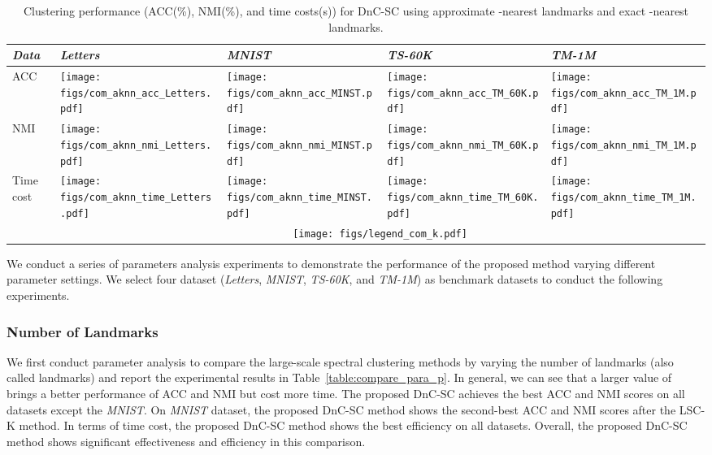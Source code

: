 \begin{table}\centering
  \caption{Clustering performance (ACC(\%), NMI(\%), and time costs(s)) for DnC-SC using approximate -nearest landmarks and exact -nearest landmarks.}
  \label{table:compare_approxKNN}
  \begin{threeparttable}
    \begin{tabular}{m{0.75cm}<{\centering}|m{1.45cm}<{\centering}m{1.45cm}<{\centering}m{1.45cm}<{\centering}m{1.45cm}<{\centering}}
      \toprule
      \emph{Data} & \emph{Letters} & \emph{MNIST} & \emph{TS-60K} & \emph{TM-1M} \\
      \midrule
      \multirow{1}{*}{ACC}
      &\texttt{[image: figs/com\_aknn\_acc\_Letters.pdf]}
      &\texttt{[image: figs/com\_aknn\_acc\_MINST.pdf]}
      &\texttt{[image: figs/com\_aknn\_acc\_TM\_60K.pdf]}
      &\texttt{[image: figs/com\_aknn\_acc\_TM\_1M.pdf]}\\
      NMI
      &\texttt{[image: figs/com\_aknn\_nmi\_Letters.pdf]}
      &\texttt{[image: figs/com\_aknn\_nmi\_MINST.pdf]}
      &\texttt{[image: figs/com\_aknn\_nmi\_TM\_60K.pdf]}
      &\texttt{[image: figs/com\_aknn\_nmi\_TM\_1M.pdf]}\\
      Time cost
      &\texttt{[image: figs/com\_aknn\_time\_Letters.pdf]}
      &\texttt{[image: figs/com\_aknn\_time\_MINST.pdf]}
      &\texttt{[image: figs/com\_aknn\_time\_TM\_60K.pdf]}
      &\texttt{[image: figs/com\_aknn\_time\_TM\_1M.pdf]}\\
      &\multicolumn{4}{c}{\texttt{[image: figs/legend\_com\_k.pdf]}}\\
      \bottomrule
    \end{tabular}
  \end{threeparttable}
\end{table}

We conduct a series of parameters analysis experiments to demonstrate the performance of the proposed method varying different parameter settings.
We select four dataset (\emph{Letters}, \emph{MNIST}, \emph{TS-60K}, and \emph{TM-1M}) as benchmark datasets to conduct the following experiments.

\subsubsection{Number of Landmarks }
\label{sec:para_p}

We first conduct parameter analysis to compare the large-scale spectral clustering methods by varying the number of landmarks  (also called landmarks) and report the experimental results in Table~\ref{table:compare_para_p}.
In general, we can see that a larger value of  brings a better performance of ACC and NMI but cost more time.
The proposed DnC-SC achieves the best ACC and NMI scores on all datasets except the \emph{MNIST}.
On \emph{MNIST} dataset, the proposed DnC-SC method shows the second-best ACC and NMI scores after the LSC-K method.
In terms of time cost, the proposed DnC-SC method shows the best efficiency on all datasets.
Overall, the proposed DnC-SC method shows significant effectiveness and efficiency in this comparison.


